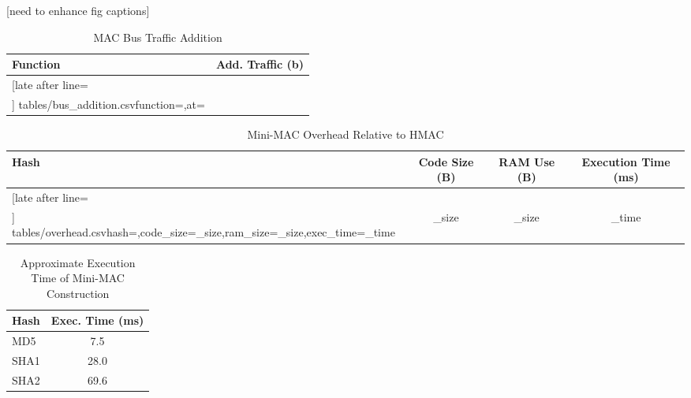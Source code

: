 [need to enhance fig captions]

	
	\begin{table}
	\centering
	\caption{MAC Bus Traffic Addition}
	\label{tab-traffic}
	\vspace{8pt}
	\begin{tabular}{l|c}%
	\bfseries Function & \bfseries Add. Traffic (b) \\\hline \csvreader[late after line=\\]%
		{tables/bus_addition.csv}{function=\function,at=\at}%
		{\function & \at}%
	\end{tabular}
	\end{table}

	\begin{table}	
	\centering	
	\caption{Mini-MAC Overhead Relative to HMAC}
	\label{tab-overhead}
	\vspace{8pt}
	\begin{tabular}{l|c|c|c}%
	\bfseries Hash & \bfseries Code Size (B) & \bfseries RAM Use (B) & \bfseries Execution Time (ms)\\\hline \csvreader[late after line=\\]%
		{tables/overhead.csv}{hash=\hash,code_size=\code_size,ram_size=\ram_size,exec_time=\exec_time}%
		{\hash & \code_size & \ram_size & \exec_time}%
	\end{tabular}
	\end{table}
	
	\begin{table}
	\centering
	\caption{Approximate Execution Time of Mini-MAC Construction}
	\label{tab-time}
	\vspace{8pt}
	\begin{tabular}{ @{}l | S[table-format=2.1]  @{}}
		\hspace{2pt}\textbf{Hash} & {\textbf{Exec. Time (ms)}} \\
		\hline 
		\hspace{2pt}MD5 & 7.5 \\
		\hspace{2pt}SHA1 & 28.0 \\
		\hspace{2pt}SHA2 & 69.6 \\ 
	\end{tabular}	
	\end{table}
	
